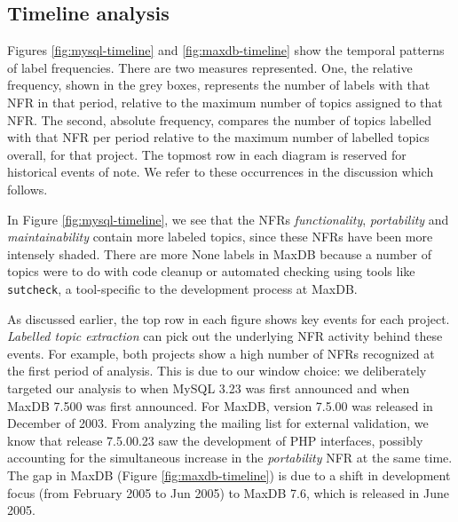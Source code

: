 \documentclass[]{sig-alternate}
\begin{document}
\subsection{Timeline analysis}
Figures \ref{fig:mysql-timeline} and \ref{fig:maxdb-timeline} show the temporal patterns of label frequencies. 
There are two measures represented. 
One, the relative frequency, shown in the grey boxes, represents the number of labels with that NFR in that period, 
relative to the maximum number of topics assigned to that NFR. 
The second, absolute frequency, compares the number of topics labelled with that NFR per period 
relative to the maximum number of labelled topics overall, for that project. 
The topmost row in each diagram is reserved for historical events of note. 
We refer to these occurrences in the discussion which follows.

In Figure \ref{fig:mysql-timeline}, we see that the NFRs \emph{functionality}, \emph{portability} and \emph{maintainability} contain more labeled topics, since these NFRs have been more intensely shaded. %
There are more \textsf{None} labels in MaxDB because a number of topics were to do with code cleanup or automated checking using tools like \texttt{sutcheck}, a tool-specific to the development process at MaxDB. 

As discussed earlier, the top row in each figure shows key events for each project. 
\textit{Labelled topic extraction} can pick out the underlying NFR activity behind these events. 
For example, both projects show a high number of NFRs recognized at the first period of analysis. 
This is due to our window choice: we deliberately targeted our analysis to when MySQL 3.23 was first announced %
and when MaxDB 7.500 was first announced. For MaxDB, version 7.5.00  was released in December of 2003. 
From analyzing the mailing list for external validation, we know that release 7.5.00.23 saw the development of PHP interfaces, possibly accounting for the simultaneous increase in the \emph{portability} NFR at the same time.
The gap in MaxDB (Figure \ref{fig:maxdb-timeline}) is due to a shift in development focus (from February 2005 to Jun 2005) to MaxDB 7.6, which is released in June 2005.
\end{document}

